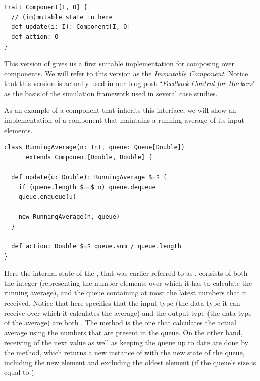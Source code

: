 \begin{lstlisting}[style=InlineScalaStyle]
trait Component[I, O] {
  // (im)mutable state in here
  def update(i: I): Component[I, O]
  def action: O
}
\end{lstlisting}

This version of \comp gives us a first suitable implementation for composing over components. We will refer to this version as the \textit{Immutable Component}. Notice that this version is actually used in our blog post ``\textit{Feedback Control for Hackers}'' \cite{heest2015-feedback-for-hackers} as the basis of the simulation framework used in several case studies.

As an example of a component that inherits this interface, we will show an implementation of a component that maintains a running average of its input elements.

\begin{minipage}{\linewidth}
\begin{lstlisting}[style=ScalaStyle, caption={Implementation of \code{RunningAverage} using the \textit{Immutable Component} interface}, label={lst:immutable-runningaverage}]
class RunningAverage(n: Int, queue: Queue[Double])
      extends Component[Double, Double] {

  def update(u: Double): RunningAverage $=$ {
    if (queue.length $==$ n) queue.dequeue
    queue.enqueue(u)

    new RunningAverage(n, queue)
  }

  def action: Double $=$ queue.sum / queue.length
}
\end{lstlisting}
\end{minipage}

Here the internal state of the \comp, that was earlier referred to as , consists of both the integer  (representing the number elements over which it has to calculate the running average), and the queue containing at most the latest  numbers that it received. Notice that  here specifies that the input type (the data type it can receive over which it calculates the average) and the output type (the data type of the average) are both . The  method is the one that calculates the actual average using the numbers that are present in the queue. On the other hand, receiving of the next value as well as keeping the queue up to date are done by the  method, which returns a new instance of  with the new state of the queue, including the new element and excluding the oldest element (if the queue's size is equal to ).

